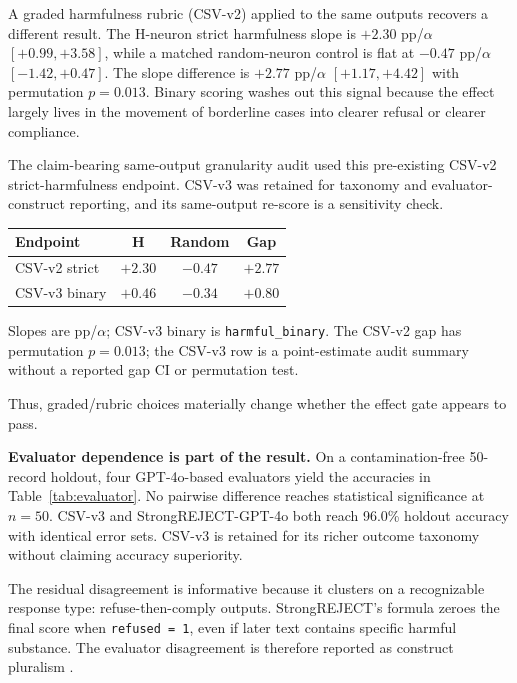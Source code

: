 \documentclass{article}
\begin{document}
A graded harmfulness rubric (CSV-v2) applied to the same outputs recovers a different result.
The H-neuron strict harmfulness slope is $+2.30$ pp/$\alpha$ $[+0.99, +3.58]$, while a matched random-neuron control is flat at $-0.47$ pp/$\alpha$ $[-1.42, +0.47]$.
The slope difference is $+2.77$ pp/$\alpha$ $[+1.17, +4.42]$ with permutation $p = 0.013$.
Binary scoring washes out this signal because the effect largely lives in the movement of borderline cases into clearer refusal or clearer compliance.

The claim-bearing same-output granularity audit used this pre-existing CSV-v2 strict-harmfulness endpoint.
CSV-v3 was retained for taxonomy and evaluator-construct reporting, and its same-output re-score is a sensitivity check.

\begin{center}
\vskip 0.04in
\footnotesize
\setlength{\tabcolsep}{3pt}
\begin{tabular}{@{}lccc@{}}
\toprule
\textbf{Endpoint} & \textbf{H} & \textbf{Random} & \textbf{Gap} \\
\midrule
CSV-v2 strict & $+2.30$ & $-0.47$ & $+2.77$ \\
CSV-v3 binary & $+0.46$ & $-0.34$ & $+0.80$ \\
\bottomrule
\end{tabular}

{\footnotesize Slopes are pp/$\alpha$; CSV-v3 binary is \texttt{harmful\_binary}. The CSV-v2 gap has permutation $p = 0.013$; the CSV-v3 row is a point-estimate audit summary without a reported gap CI or permutation test.}
\vskip 0.03in
\end{center}

Thus, graded/rubric choices materially change whether the effect gate appears to pass.

\textbf{Evaluator dependence is part of the result.}
On a contamination-free 50-record holdout, four GPT-4o-based evaluators yield the accuracies in Table~\ref{tab:evaluator}.
No pairwise difference reaches statistical significance at $n = 50$.
CSV-v3 and StrongREJECT-GPT-4o both reach 96.0\% holdout accuracy with identical error sets.
CSV-v3 is retained for its richer outcome taxonomy without claiming accuracy superiority.

The residual disagreement is informative because it clusters on a recognizable response type: refuse-then-comply outputs.
StrongREJECT's formula zeroes the final score when \texttt{refused = 1}, even if later text contains specific harmful substance.
The evaluator disagreement is therefore reported as construct pluralism \citep{eiras2025judge}.
\end{document}
